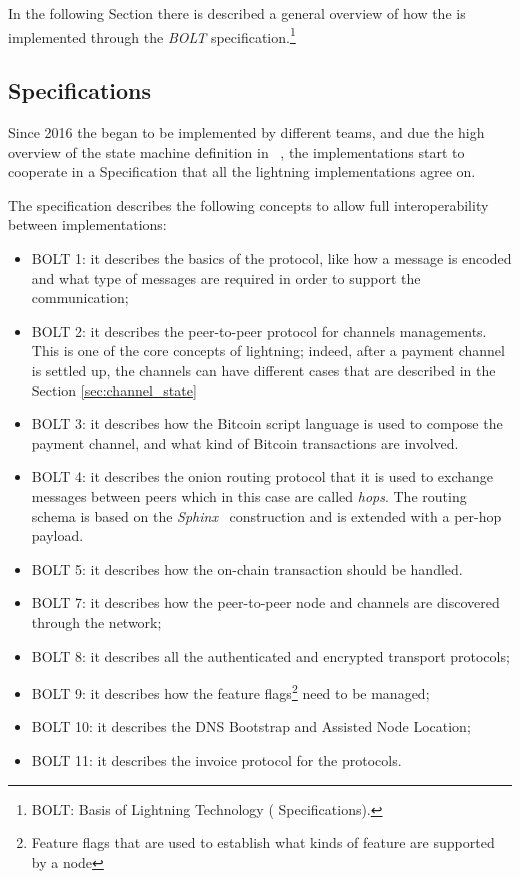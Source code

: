 In the following Section there is described a general overview of how the {\LN} is implemented through the
\emph{BOLT} specification.\footnote{BOLT: Basis of Lightning Technology ({\LN} Specifications).}

\subsection{{\LN} Specifications}

Since 2016 the {\LN} began to be implemented by different teams,
and due the high overview of the {\LN} state machine definition in ~\cite{lightning-network-paper},
the implementations start to cooperate in a Specification that all the lightning implementations agree on.

The specification describes the following concepts to allow full interoperability between implementations:

\begin{itemize}
  \item BOLT 1: it describes the basics of the protocol, like how a message is encoded and what type of messages are required in order to support the communication;
  \item BOLT 2: it describes the peer-to-peer protocol for channels managements. This is one of the core concepts of lightning; indeed,  after a payment channel
        is settled up, the channels can have different cases that are described in the Section \ref{sec:channel_state}
  \item BOLT 3: it describes how the Bitcoin script language is used to compose the
        payment channel, and what kind of Bitcoin transactions are involved.
  \item BOLT 4: it describes the onion routing protocol that it is used to exchange messages between peers which in this case are called \emph{hops}.
        The routing schema is based on the \emph{Sphinx}~\cite{sphinx} construction and is extended with a per-hop payload.
  \item BOLT 5: it describes how the on-chain transaction should be handled.
  \item BOLT 7: it describes how the peer-to-peer node and channels are discovered through the network;
  \item BOLT 8: it describes all the authenticated and encrypted transport protocols;
  \item BOLT 9: it describes how the feature flags\footnote{Feature flags that are used to establish what kinds of feature are supported by a node} need to be managed;
  \item BOLT 10: it describes the DNS Bootstrap and Assisted Node Location;
  \item BOLT 11: it describes the invoice protocol for the {\LN} protocols.
\end{itemize}

